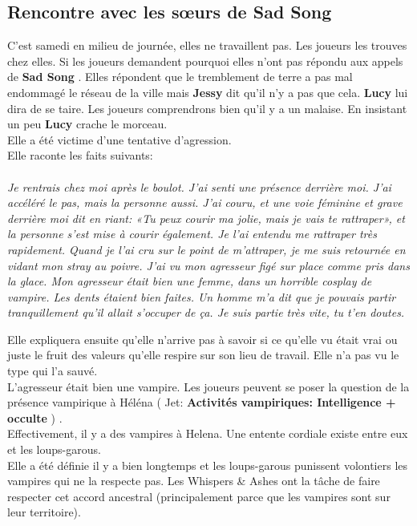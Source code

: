 \documentclass[oneside,12pt]{book}
\newcommand\roll[1]{
( Jet: \textbf{#1})
}
\newcommand{\Mathew}{\textbf{Sad Song} }
\begin{document}
\begin{flushleft}
\subsection{Rencontre avec les sœurs de \Mathew}
C’est samedi en milieu de journée, elles ne travaillent pas. Les joueurs les trouves chez elles.  
Si les joueurs demandent pourquoi elles n’ont pas répondu aux appels de \Mathew . Elles répondent que le tremblement de terre a pas mal endommagé le réseau de la ville mais 
\textbf{Jessy} dit qu’il n’y a pas que cela. \textbf{Lucy} lui dira de se taire. Les joueurs comprendrons bien qu’il y a un malaise. En insistant un peu \textbf{Lucy} crache le morceau.\\
Elle a été victime d’une tentative d’agression. \\
Elle raconte les faits suivants:\\

\textit{\\
Je rentrais chez moi après le boulot. J’ai senti une présence derrière moi. J’ai accéléré le pas, mais la personne aussi. J’ai couru, et une voie féminine et grave derrière moi dit en riant: «Tu peux courir ma jolie, mais je vais te rattraper», et la personne s’est mise à courir également. Je l’ai entendu me rattraper très rapidement. Quand je l’ai cru sur le point de m’attraper, je me suis retournée en vidant mon stray au poivre. J’ai vu mon agresseur figé sur place comme pris dans la glace. Mon agresseur était bien une femme, dans un horrible cosplay de vampire. Les dents étaient bien faites. Un homme m’a dit que je pouvais partir tranquillement qu’il allait s’occuper de ça. Je suis partie très vite, tu t’en doutes.\\}
\bigbreak

Elle expliquera ensuite qu’elle n’arrive pas à savoir si ce qu’elle vu était vrai ou juste le fruit des valeurs qu’elle respire sur son lieu de travail.
Elle n’a pas vu le type qui l’a sauvé. \\

L’agresseur était bien une vampire. Les joueurs peuvent se poser la question de la présence vampirique à Héléna \roll{Activités vampiriques: Intelligence + occulte }.\\
Effectivement, il y a des vampires à Helena. Une entente cordiale existe entre eux et les loups-garous.\\
Elle a été définie il y a bien longtemps et les loups-garous punissent volontiers les vampires qui ne la respecte pas. Les Whispers \& Ashes ont la tâche de faire respecter cet accord ancestral (principalement parce que les vampires sont sur leur territoire).\\ 


\end{flushleft}
\end{document}
